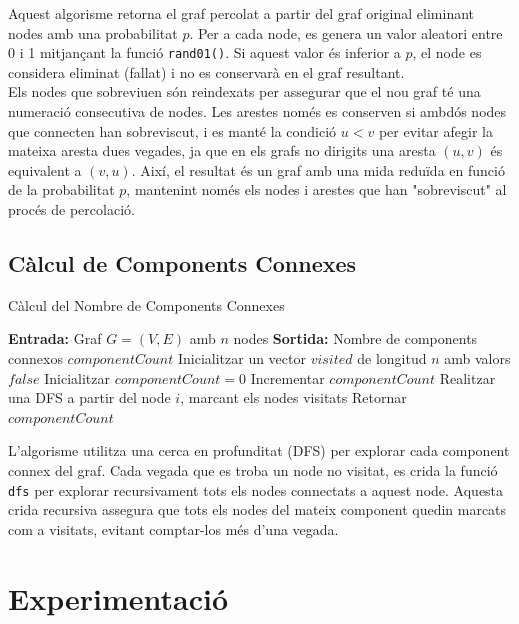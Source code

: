 \documentclass[a4paper]{article}
\begin{document}
	Aquest algorisme retorna el graf percolat a partir del graf original eliminant nodes amb una probabilitat $p$. Per a cada node, es genera un valor aleatori entre 0 i 1 mitjançant la funció \texttt{rand01()}. Si aquest valor és inferior a $p$, el node es considera eliminat (fallat) i no es conservarà en el graf resultant. \\
	
	Els nodes que sobreviuen són reindexats per assegurar que el nou graf té una numeració consecutiva de nodes. Les arestes només es conserven si ambdós nodes que connecten han sobreviscut, i es manté la condició $u<v$ per evitar afegir la mateixa aresta dues vegades, ja que en els grafs no dirigits una aresta $(u,v)$ és equivalent a $(v,u)$. Així, el resultat és un graf amb una mida reduïda en funció de la probabilitat $p$, mantenint només els nodes i arestes que han "sobreviscut" al procés de percolació.
	
	\subsection{Càlcul de Components Connexes}
	\begin{algorithm} [H]
		\caption{Càlcul del Nombre de Components Connexes}
		\begin{algorithmic} [1]
			\Statex \textbf{Entrada:} Graf $G = (V, E)$ amb $n$ nodes
			\Statex \textbf{Sortida:} Nombre de components connexos $componentCount$
			\Statex \vspace{-0.25em}
			\State Inicialitzar un vector $visited$ de longitud $n$ amb valors $false$
			\State Inicialitzar $componentCount = 0$
					\State Incrementar $componentCount$
					\State Realitzar una DFS a partir del node $i$, marcant els nodes visitats
				\EndIf
			\EndFor
			\State Retornar $componentCount$
		\end{algorithmic}
	\end{algorithm}
	
	L'algorisme utilitza una cerca en profunditat (DFS) per explorar cada component connex del graf. Cada vegada que es troba un node no visitat, es crida la funció \texttt{dfs} per explorar recursivament tots els nodes connectats a aquest node. Aquesta crida recursiva assegura que tots els nodes del mateix component quedin marcats com a visitats, evitant comptar-los més d'una vegada. 

	\newpage
	\section{Experimentació}
	
\end{document}
